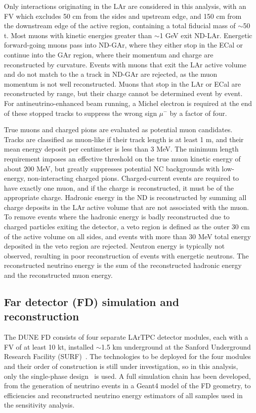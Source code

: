 Only interactions originating in the LAr are considered in this analysis, with an FV which excludes 50 cm from the sides and upstream edge, and 150 cm from the downstream edge of the active region, containing a total fiducial mass of $\sim$50 t. Most muons with kinetic energies greater than $\sim$1 GeV exit ND-LAr. Energetic forward-going muons pass into ND-GAr, where they either stop in the ECal or continue into the GAr region, where their momentum and charge are reconstructed by curvature. Events with muons that exit the LAr active volume and do not match to the a track in ND-GAr are rejected, as the muon momentum is not well reconstructed. Muons that stop in the LAr or ECal are reconstructed by range, but their charge cannot be determined event by event. For antineutrino-enhanced beam running, a Michel electron is required at the end of these stopped tracks to suppress the wrong sign $\mu^-$ by a factor of four.

True muons and charged pions are evaluated as potential muon candidates. Tracks are classified as muon-like if their track length is at least 1 m, and their mean energy deposit per centimeter is less than 3 MeV. The minimum length requirement imposes an effective threshold on the true muon kinetic energy of about 200 MeV, but greatly suppresses potential NC backgrounds with low-energy, non-interacting charged pions. Charged-current events are required to have exactly one muon, and if the charge is reconstructed, it must be of the appropriate charge. Hadronic energy in the ND is reconstructed by summing all charge deposits in the LAr active volume that are not associated with the muon. To remove events where the hadronic energy is badly reconstructed due to charged particles exiting the detector, a veto region is defined as the outer 30 cm of the active volume on all sides, and events with more than 30 MeV total energy deposited in the veto region are rejected. Neutron energy is typically not observed, resulting in poor reconstruction of events with energetic neutrons. The reconstructed neutrino energy is the sum of the reconstructed hadronic energy and the reconstructed muon energy.

\subsection{Far detector (FD) simulation and reconstruction}
The DUNE FD consists of four separate LArTPC detector modules, each with a FV of at least 10 kt, installed $\sim$1.5 km underground at the Sanford Underground Research Facility (SURF)~\cite{Abi:2018dnh}. The technologies to be deployed for the four modules and their order of construction is still under investigation, so in this analysis, only the single-phase design~\cite{Abi:2020loh} is used. A full simulation chain has been developed, from the generation of neutrino events in a Geant4 model of the FD geometry, to efficiencies and reconstructed neutrino energy estimators of all samples used in the sensitivity analysis.

